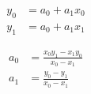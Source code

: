 \begin{align}
  y_0 & = a_0+a_1 x_0  \\
   y_1 & = a_0+a_1 x_1  
\end{align}

 
\begin{align}
   a_0 & = \frac
{x_0 y_1 - x_1 y_0}
{x_0 - x_1} \\
   a_1 & = \frac
{y_0 - y_1}
{x_0 - x_1} 
\end{align}
